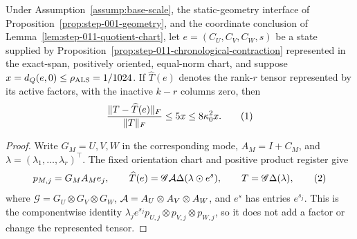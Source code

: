 \begin{lemma}\label{lem:step-012-residual-transfer}
Under Assumption~\ref{assump:base-scale}, the static-geometry interface of
Proposition~\ref{prop:step-001-geometry}, and the coordinate
conclusion of Lemma~\ref{lem:step-011-quotient-chart}, let
\(e=(C_U,C_V,C_W,s)\) be a state supplied by Proposition~\ref{prop:step-011-chronological-contraction} represented in
the exact-span, positively oriented, equal-norm chart, and suppose
\(x=d_Q(e,0)\le\rho_{\rm ALS}=1/1024\).  If \(\widehat T(e)\) denotes the
rank-\(r\) tensor represented by its active factors, with the inactive
\(k-r\) columns zero, then
\[
 { \|T-\widehat T(e)\|_F\over\|T\|_F}\le5x\le8\kappa_0^2x.
\tag{1}
\]

\begin{proof}
Write \(G_M=U,V,W\) in the corresponding mode,
\(A_M=I+C_M\), and \(\lambda=(\lambda_1,\ldots,\lambda_r)^\top\). The fixed orientation chart
and positive product register give
\[
 p_{M,j}=G_MA_Me_j,\qquad
 \widehat T(e)={\mathscr G}{\cal A}\Delta(\lambda\odot e^s),
 \qquad T={\mathscr G}\Delta(\lambda),
\tag{2}
\]
where \({\mathscr G}=G_U\otimes G_V\otimes G_W\),
\({\cal A}=A_U\otimes A_V\otimes A_W\), and \(e^s\) has entries \(e^{s_j}\).
This is the componentwise identity
\(\lambda_je^{s_j}p_{U,j}\otimes p_{V,j}\otimes p_{W,j}\), so it does not
add a factor or change the represented tensor.


\end{proof}
\end{lemma}
